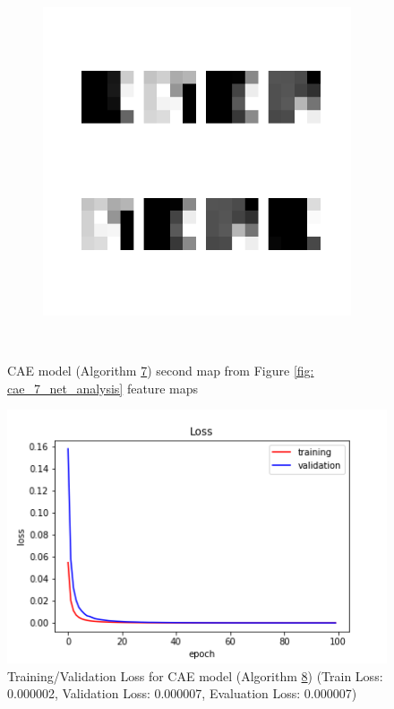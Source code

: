 \begin{figure}
\begin{subfigure}[b]{0.4\linewidth}
    \end{subfigure}
    \hfill
    \begin{subfigure}[b]{0.4\linewidth}
        \includegraphics[width=\linewidth]{images/cae_online_lstm/caelstm_section_cae_training_block_map_10000_model_feature_maps_map_1_0_0.png}
    \end{subfigure}
    \\[-0.5cm]
    \caption{CAE model (Algorithm \hyperref[tab: app_evalalgorithms]{7}) second map from Figure \ref{fig: cae_7_net_analysis} feature maps}
    \label{fig: cae_7_feature_maps_2}
\end{figure}


\begin{figure}
    \centerfloat
    \includegraphics[scale=0.6]{images/cae_online_lstm/caelstm_section_cae_training_house_10000_model_loss.png}
    \caption{Training/Validation Loss for CAE model (Algorithm \hyperref[tab: app_evalalgorithms]{8}) (Train Loss: 0.000002, Validation Loss: 0.000007, Evaluation Loss: 0.000007)}
    \label{fig: cae_8_train}
\end{figure}

